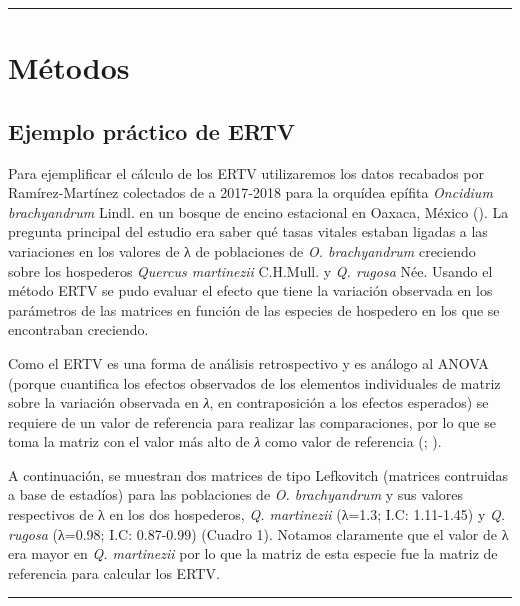 \documentclass[
]{book}
\theoremstyle{definition}
\theoremstyle{definition}
\theoremstyle{definition}
\theoremstyle{definition}
\theoremstyle{remark}
\begin{document}
\begin{center}\rule{0.5\linewidth}{0.5pt}\end{center}

\section{Métodos}\label{muxe9todos-1}

\subsection{Ejemplo práctico de ERTV}\label{ejemplo-pruxe1ctico-de-ertv}

Para ejemplificar el cálculo de los ERTV utilizaremos los datos recabados por Ramírez-Martínez colectados de a 2017-2018 para la orquídea epífita \emph{Oncidium brachyandrum} Lindl. en un bosque de encino estacional en Oaxaca, México (\citet{ramirez2021host}). La pregunta principal del estudio era saber qué tasas vitales estaban ligadas a las variaciones en los valores de λ de poblaciones de \emph{O. brachyandrum} creciendo sobre los hospederos \emph{Quercus martinezii} C.H.Mull. y \emph{Q. rugosa} Née. Usando el método ERTV se pudo evaluar el efecto que tiene la variación observada en los parámetros de las matrices en función de las especies de hospedero en los que se encontraban creciendo.

Como el ERTV es una forma de análisis retrospectivo y es análogo al ANOVA (porque cuantifica los efectos observados de los elementos individuales de matriz sobre la variación observada en \emph{λ}, en contraposición a los efectos esperados) se requiere de un valor de referencia para realizar las comparaciones, por lo que se toma la matriz con el valor más alto de \emph{λ} como valor de referencia (\citet{caswell2010life}; \citet{timsina2021six}).

A continuación, se muestran dos matrices de tipo Lefkovitch (matrices contruidas a base de estadíos) para las poblaciones de \emph{O. brachyandrum} y sus valores respectivos de λ en los dos hospederos, \emph{Q. martinezii} (λ=1.3; I.C: 1.11-1.45) y \emph{Q. rugosa} (λ=0.98; I.C: 0.87-0.99) (Cuadro 1). Notamos claramente que el valor de λ era mayor en \emph{Q. martinezii} por lo que la matriz de esta especie fue la matriz de referencia para calcular los ERTV.

\begin{center}\rule{0.5\linewidth}{0.5pt}\end{center}
\end{document}
